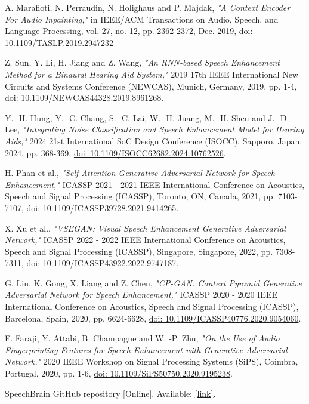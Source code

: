\begin{thebibliography}{99}
    A. Marafioti, N. Perraudin, N. Holighaus and P. Majdak, \textit{"A Context Encoder For Audio Inpainting,"} in IEEE/ACM Transactions on Audio, Speech, and Language Processing, vol. 27, no. 12, pp. 2362-2372, Dec. 2019, \href{https://ieeexplore.ieee.org/document/8867915}{doi: 10.1109/TASLP.2019.2947232}
    


    Z. Sun, Y. Li, H. Jiang and Z. Wang, \textit{"An RNN-based Speech Enhancement Method for a Binaural Hearing Aid System,"} 2019 17th IEEE International New Circuits and Systems Conference (NEWCAS), Munich, Germany, 2019, pp. 1-4, doi: 10.1109/NEWCAS44328.2019.8961268.


    Y. -H. Hung, Y. -C. Chang, S. -C. Lai, W. -H. Juang, M. -H. Sheu and J. -D. Lee, \textit{"Integrating Noise Classification and Speech Enhancement Model for Hearing Aids,"} 2024 21st International SoC Design Conference (ISOCC), Sapporo, Japan, 2024, pp. 368-369, \href{https://ieeexplore.ieee.org/document/10762526}{doi: 10.1109/ISOCC62682.2024.10762526}.

    H. Phan et al., \textit{"Self-Attention Generative Adversarial Network for Speech Enhancement,"} ICASSP 2021 - 2021 IEEE International Conference on Acoustics, Speech and Signal Processing (ICASSP), Toronto, ON, Canada, 2021, pp. 7103-7107, \href{https://ieeexplore.ieee.org/document/9414265}{doi: 10.1109/ICASSP39728.2021.9414265}.
    
    X. Xu et al., \textit{"VSEGAN: Visual Speech Enhancement Generative Adversarial Network,"} ICASSP 2022 - 2022 IEEE International Conference on Acoustics, Speech and Signal Processing (ICASSP), Singapore, Singapore, 2022, pp. 7308-7311, \href{https://ieeexplore.ieee.org/document/9747187}{doi: 10.1109/ICASSP43922.2022.9747187}.


    G. Liu, K. Gong, X. Liang and Z. Chen, \textit{"CP-GAN: Context Pyramid Generative Adversarial Network for Speech Enhancement,"} ICASSP 2020 - 2020 IEEE International Conference on Acoustics, Speech and Signal Processing (ICASSP), Barcelona, Spain, 2020, pp. 6624-6628, \href{https://ieeexplore.ieee.org/document/9054060}{doi: 10.1109/ICASSP40776.2020.9054060}.

    F. Faraji, Y. Attabi, B. Champagne and W. -P. Zhu,\textit{ "On the Use of Audio Fingerprinting Features for Speech Enhancement with Generative Adversarial Network,"} 2020 IEEE Workshop on Signal Processing Systems (SiPS), Coimbra, Portugal, 2020, pp. 1-6, \href{https://ieeexplore.ieee.org/document/9195238}{doi: 10.1109/SiPS50750.2020.9195238}.


    SpeechBrain GitHub repository [Online]. Available: \href{https://github.com/speechbrain/speechbrain/blob/develop/speechbrain/lobes/models/MetricGAN.py}{[link]}.

\end{thebibliography}

